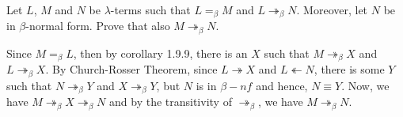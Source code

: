 \begin{problem}{1.18}
    Let \(L\), \(M\) and \(N\) be \(\lambda\)-terms such that \(L =_{\beta} M\) and \(L \twoheadrightarrow_{\beta} N\). Moreover, let \(N\) be in \(\beta\)-normal form. Prove that also \(M \twoheadrightarrow_{\beta} N\).
\end{problem}

\begin{solution}
    Since $M =_\beta L$, then by corollary 1.9.9, there is an $X$ such that $M \twoheadrightarrow_\beta X$ and $L \twoheadrightarrow_\beta X$. By Church-Rosser Theorem, since $L \twoheadrightarrow X$ and $L \twoheadleftarrow N$, 
        there is some $Y$ such that $N \twoheadrightarrow_\beta Y$ and $X \twoheadrightarrow_\beta Y$, but $N$ is in $\beta-nf$ and hence, $N \equiv Y$.
        Now, we have $M \twoheadrightarrow_\beta X \twoheadrightarrow_\beta N$ and by the transitivity of $\twoheadrightarrow_\beta$, we have $M \twoheadrightarrow_\beta N$.
\end{solution}